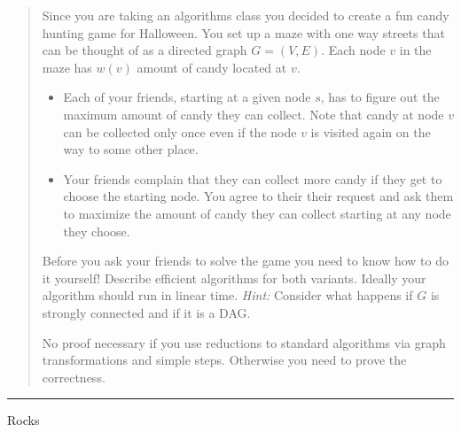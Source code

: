 \documentclass[11pt]{article}
\begin{document}
\begin{quote}
Since you are taking an algorithms class you decided to create a
  fun candy hunting game for Halloween. You set up a maze with one
  way streets that can be thought of as a directed graph
  $G=(V,E)$. Each node $v$ in the maze has $w(v)$ amount of candy
  located at $v$.
  \begin{itemize}
  \item Each of your friends, starting at a given node $s$, has to
    figure out the maximum amount of candy they can collect. Note that
    candy at node $v$ can be collected only once even if the node $v$
    is visited again on the way to some other place.
  \item Your friends complain that they can collect more candy if they
    get to choose the starting node. You agree to their their request
    and ask them to maximize the amount of candy they can collect
    starting at any node they choose.
  \end{itemize}
  Before you ask your friends to solve the game you need to know how
  to do it yourself!  Describe efficient algorithms for both variants.
  Ideally your algorithm should run in linear time.
  {\em Hint:} Consider what happens if $G$ is strongly connected and
  if it is a DAG.

  No proof necessary if you use reductions to standard algorithms via
  graph transformations and simple steps. Otherwise you need to prove
  the correctness.
\end{quote}
\hrule



\begin{solution}
    Rocks
\end{solution}
\end{document}
